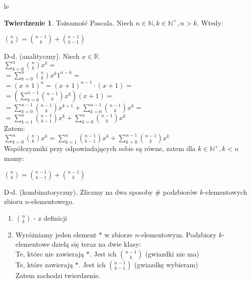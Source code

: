 le\documentclass{article}
\theoremstyle{definition}
\theoremstyle{definition}
\newtheorem{tw}{Twierdzenie}[subsection]
\theoremstyle{definition}
\theoremstyle{definition}
\begin{document}
\begin{tw}
  Tożsamość Pascala. Niech $n\in \mathbb{N}, k\in \mathbb{N}^{+}, n>k$. Wtedy:
  \begin{center}
    $\binom{n}{k} = \binom{n-1}{k} + \binom{n-1}{k-1}$
  \end{center}
  D-d. (analityczny). Niech $x\in\mathbb{R}$.\\
  $\sum_{k=0}^{n} \binom{n}{k} x^{k}=$\\
  $=\sum_{k=0}^{n} \binom{n}{k} x^{k} 1^{n-k}=$\\
  $=(x+1)^{n} = (x+1)^{n-1} \cdot (x+1)=$\\
  $=(\sum_{k=0}^{n-1} \binom{n-1}{k} x^k)(x+1)=$\\
  $=\sum_{k=0}^{n-1} \binom{n-1}{k} x^{k+1} + \sum_{k=0}^{n-1} \binom{n-1}{k} x^{k}=$\\
  $=\sum_{k=1}^{n} \binom{n-1}{k-1} x^{k} + \sum_{k=0}^{n} \binom{n-1}{k} x^k$\\
  Zatem:\\
  $\sum_{k=0}^{n} \binom{n}{k} x^k = \sum_{k=1}^{n} \binom{n-1}{k-1} x^k + \sum_{k=0}^{n-1} \binom{n-1}{k} x^k$\\
  Współczynniki przy odpowiadających sobie są równe, zatem dla $k\in\mathbb{N}^{+}, k<n$ mamy:
  
  \begin{center}
    $\binom{n}{k} = \binom{n-1}{k-1} + \binom{n-1}{k}$
  \end{center}
  D-d. (kombinatoryczny). Zliczmy na dwa sposoby \# podzbiorów $k$-elementowych zbioru $n$-elementowego.
  \begin{enumerate}
    \item $\binom{n}{k}$ - z definicji
    \item Wyróżniamy jeden element $*$ w zbiorze $n$-elementowym. Podzbiory $k$-elementowe dzielą się teraz na dwie klasy:\\
      Te, które nie zawierają $*$. Jest ich $\binom{n-1}{k}$ (gwiazdki nie ma)\\
      Te, które zawierają $*$. Jest ich $\binom{n-1}{k-1}$ (gwiazdkę wybieram)\\
      Zatem zachodzi twierdzenie.
  \end{enumerate}
\end{tw}
\end{document}
